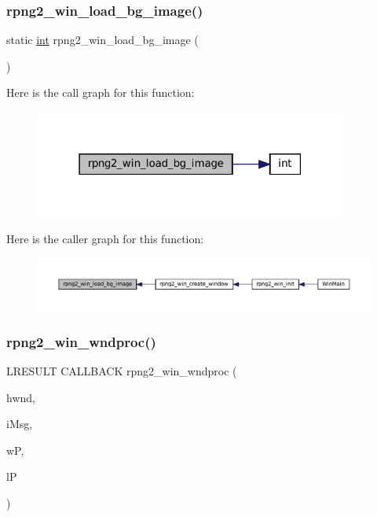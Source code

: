 \subsubsection{\texorpdfstring{rpng2\+\_\+win\+\_\+load\+\_\+bg\+\_\+image()}{rpng2\_win\_load\_bg\_image()}}
{\footnotesize\ttfamily static \mbox{\hyperlink{ioapi_8h_a787fa3cf048117ba7123753c1e74fcd6}{int}} rpng2\+\_\+win\+\_\+load\+\_\+bg\+\_\+image (\begin{DoxyParamCaption}\item[{void}]{ }\end{DoxyParamCaption})\hspace{0.3cm}{\ttfamily [static]}}

Here is the call graph for this function\+:
\nopagebreak
\begin{figure}[H]
\begin{center}
\leavevmode
\includegraphics[width=291pt]{rpng2-win_8c_a36ca0b965012c0dda68b0bd0485a70e5_cgraph}
\end{center}
\end{figure}
Here is the caller graph for this function\+:
\nopagebreak
\begin{figure}[H]
\begin{center}
\leavevmode
\includegraphics[width=350pt]{rpng2-win_8c_a36ca0b965012c0dda68b0bd0485a70e5_icgraph}
\end{center}
\end{figure}
\mbox{\label{rpng2-win_8c_af35a8c9c18f04bd6f13dc0add6c528e9}} 
\subsubsection{\texorpdfstring{rpng2\+\_\+win\+\_\+wndproc()}{rpng2\_win\_wndproc()}}
{\footnotesize\ttfamily L\+R\+E\+S\+U\+LT C\+A\+L\+L\+B\+A\+CK rpng2\+\_\+win\+\_\+wndproc (\begin{DoxyParamCaption}\item[{H\+W\+ND}]{hwnd,  }\item[{U\+I\+NT}]{i\+Msg,  }\item[{W\+P\+A\+R\+AM}]{wP,  }\item[{L\+P\+A\+R\+AM}]{lP }\end{DoxyParamCaption})}

